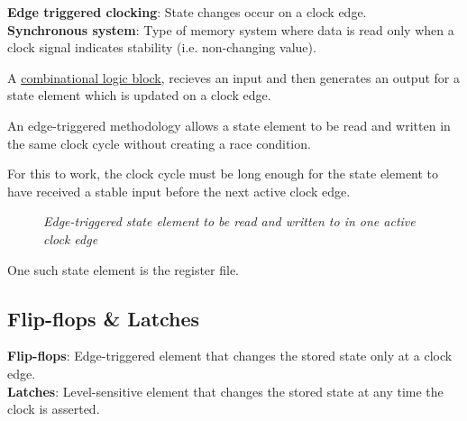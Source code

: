 \documentclass[11pt]{article}
\begin{document}
\begin{tcolorbox}[
    enhanced,
    attach boxed title to top left={xshift=6mm,yshift=-1.5mm},
    colback=moonstoneblue!20,
    colframe=moonstoneblue,
    colbacktitle=moonstoneblue,
    title=Clocking methodology semantics,
    fonttitle=\bfseries\color{white},
    boxed title style={size=small,colframe=moonstoneblue,sharp corners},
    sharp corners,
]
    {\color{moondark}\textbf{Edge triggered clocking}}: State changes occur on a clock edge. \\
    {\color{moondark}\textbf{Synchronous system}}: Type of memory system where data is read only when a clock signal indicates stability (i.e. non-changing value).
\end{tcolorbox}

A \hyperref[box:logic-types]{combinational logic block}, recieves an input and then generates an output for a state element which is updated on a clock edge.

An edge-triggered methodology allows a state element to be read and written in the same clock cycle without creating a race condition.

For this to work, the clock cycle must be long enough for the state element to have received a stable input before the next active clock edge.

\begin{figure}[htbp]
    \centering
    \caption{\textit{Edge-triggered state element to be read and written to in one active clock edge}}
\end{figure}

One such state element is the register file.

\subsection*{Flip-flops \& Latches}

\begin{tcolorbox}[
    enhanced,
    attach boxed title to top left={xshift=6mm,yshift=-1.5mm},
    colback=moonstoneblue!20,
    colframe=moonstoneblue,
    colbacktitle=moonstoneblue,
    title=Types of clocked memory elements,
    fonttitle=\bfseries\color{white},
    boxed title style={size=small,colframe=moonstoneblue,sharp corners},
    sharp corners,
]
    {\color{moondark}\textbf{Flip-flops}}: Edge-triggered element that changes the stored state only at a clock edge. \\
    {\color{moondark}\textbf{Latches}}: Level-sensitive element that changes the stored state at any time the clock is asserted.
\end{tcolorbox}
\end{document}

